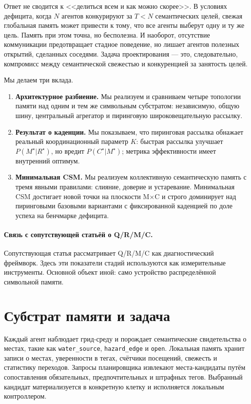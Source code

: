 \documentclass{article}
\begin{document}
Ответ не сводится к <<делиться всем и как можно скорее>>. В условиях
дефицита, когда $N$ агентов конкурируют за $T<N$ семантических целей,
свежая глобальная память может привести к тому, что все агенты выберут
одну и ту же цель. Память при этом точна, но бесполезна. И наоборот,
отсутствие коммуникации предотвращает стадное поведение, но лишает
агентов полезных открытий, сделанных соседями. Задача проектирования
--- это, следовательно, компромисс между семантической свежестью и
конкуренцией за занятость целей.

Мы делаем три вклада.
\begin{enumerate}[leftmargin=20pt,itemsep=2pt,topsep=2pt]
\item \textbf{Архитектурное разбиение.} Мы реализуем и сравниваем четыре топологии памяти над одним и тем же символьным субстратом: независимую, общую шину, центральный агрегатор и пиринговую широковещательную рассылку.
\item \textbf{Результат о каденции.} Мы показываем, что пиринговая рассылка обнажает реальный координационный параметр $K$: быстрая рассылка улучшает $P(M^\star|R^\star)$, но вредит $P(C^\star|M^\star)$; метрика эффективности имеет внутренний оптимум.
\item \textbf{Минимальная CSM.} Мы реализуем коллективную семантическую память с тремя явными правилами: слияние, доверие и устаревание. Минимальная CSM достигает новой точки на плоскости M$\times$C и строго доминирует над пиринговыми базовыми вариантами с фиксированной каденцией по доле успеха на бенчмарке дефицита.
\end{enumerate}

\paragraph{Связь с сопутствующей статьёй о Q/R/M/C.}
Сопутствующая статья рассматривает Q/R/M/C как диагностический
фреймворк. Здесь эти показатели стадий используются как измерительные
инструменты. Основной объект иной: само устройство распределённой
символьной памяти.

\section{Субстрат памяти и задача}
\label{sec:substrate}

Каждый агент наблюдает грид-среду и порождает семантические
свидетельства о местах, такие как \texttt{water\_source},
\texttt{hazard\_edge} и \texttt{open}. Локальная память хранит записи
о местах, уверенности в тегах, счётчики посещений, свежесть и
статистику переходов. Запросы планировщика извлекают
места-кандидаты путём сопоставления обязательных, предпочтительных и
штрафных тегов. Выбранный кандидат материализуется в конкретную клетку
и исполняется локальным контроллером.
\end{document}
